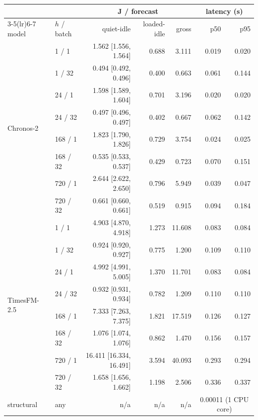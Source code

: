 \begin{tabular}{llrrrrr}
\toprule
& & \multicolumn{3}{c}{J / forecast} & \multicolumn{2}{c}{latency (s)} \\
\cmidrule(lr){3-5}\cmidrule(lr){6-7}
model & $h$ / batch & quiet-idle & loaded-idle & gross & p50 & p95 \\
\midrule
\multirow{8}{*}{Chronos-2}
 & 1 / 1 & 1.562 [1.556, 1.564] & 0.688 & 3.111 & 0.019 & 0.020 \\
 & 1 / 32 & 0.494 [0.492, 0.496] & 0.400 & 0.663 & 0.061 & 0.144 \\
 & 24 / 1 & 1.598 [1.589, 1.604] & 0.701 & 3.196 & 0.020 & 0.020 \\
 & 24 / 32 & 0.497 [0.496, 0.497] & 0.402 & 0.667 & 0.062 & 0.142 \\
 & 168 / 1 & 1.823 [1.790, 1.826] & 0.729 & 3.754 & 0.024 & 0.025 \\
 & 168 / 32 & 0.535 [0.533, 0.537] & 0.429 & 0.723 & 0.070 & 0.151 \\
 & 720 / 1 & 2.644 [2.622, 2.650] & 0.796 & 5.949 & 0.039 & 0.047 \\
 & 720 / 32 & 0.661 [0.660, 0.661] & 0.519 & 0.915 & 0.094 & 0.184 \\
\midrule
\multirow{8}{*}{TimesFM-2.5}
 & 1 / 1 & 4.903 [4.870, 4.918] & 1.273 & 11.608 & 0.083 & 0.084 \\
 & 1 / 32 & 0.924 [0.920, 0.927] & 0.775 & 1.200 & 0.109 & 0.110 \\
 & 24 / 1 & 4.992 [4.991, 5.005] & 1.370 & 11.701 & 0.083 & 0.084 \\
 & 24 / 32 & 0.932 [0.931, 0.934] & 0.782 & 1.209 & 0.110 & 0.110 \\
 & 168 / 1 & 7.333 [7.263, 7.375] & 1.821 & 17.519 & 0.126 & 0.127 \\
 & 168 / 32 & 1.076 [1.074, 1.076] & 0.862 & 1.470 & 0.156 & 0.157 \\
 & 720 / 1 & 16.411 [16.334, 16.491] & 3.594 & 40.093 & 0.293 & 0.294 \\
 & 720 / 32 & 1.658 [1.656, 1.662] & 1.198 & 2.506 & 0.336 & 0.337 \\
\midrule
structural & any & n/a & n/a & n/a & \multicolumn{2}{c}{0.00011 (1 CPU core)} \\
\bottomrule
\end{tabular}
